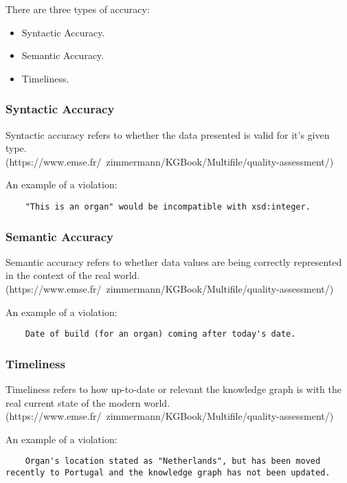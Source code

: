 There are three types of accuracy: 
\begin{itemize}
\item Syntactic Accuracy.
\item Semantic Accuracy.
\item Timeliness.
\end{itemize}

\subsubsection{Syntactic Accuracy}
\hspace{0.5cm} Syntactic accuracy refers to whether the data presented is valid for it's given type. \\
(https://www.emse.fr/~zimmermann/KGBook/Multifile/quality-assessment/) 

An example of a violation: 
\begin{lstlisting}
    "This is an organ" would be incompatible with xsd:integer.
\end{lstlisting}

\subsubsection{Semantic Accuracy}
\hspace{0.5cm} Semantic accuracy refers to whether data values are being correctly represented in the context of the real world.  \\ (https://www.emse.fr/~zimmermann/KGBook/Multifile/quality-assessment/) 

An example of a violation: 
\begin{lstlisting}
    Date of build (for an organ) coming after today's date. 
\end{lstlisting}

\subsubsection{Timeliness}
\hspace{0.5cm} Timeliness refers to how up-to-date or relevant the knowledge graph is with the real current state of the modern world. \\ (https://www.emse.fr/~zimmermann/KGBook/Multifile/quality-assessment/) 

An example of a violation: 
\begin{lstlisting}
    Organ's location stated as "Netherlands", but has been moved recently to Portugal and the knowledge graph has not been updated.
\end{lstlisting}

